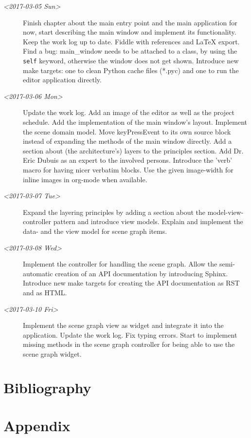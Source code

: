 \documentclass[10pt, openright, notitlepage]{scrreprt}
\begin{document}
\begin{description}
\item[{\textit{<2017-03-05 Sun>}}] Finish chapter about the main entry point and the main
application for now, start describing the main window and implement its
functionality. Keep the work log up to date. Fiddle with references and
\LaTeX{} export. Find a bug: main\_window needs to be attached to a class, by
using the \texttt{self} keyword, otherwise the window does not get shown.
Introduce new make targets: one to clean Python cache files (*.pyc) and one
to run the editor application directly.

\item[{\textit{<2017-03-06 Mon>}}] Update the work log. Add an image of the editor as well as
the project schedule. Add the implementation of the main window's layout.
Implement the scene domain model. Move keyPressEvent to its own source
block instead of expanding the methods of the main window directly. Add a
section about (the architecture's) layers to the principles section. Add
Dr. Eric Dubuis as an expert to the involved persons. Introduce the 'verb'
macro for having nicer verbatim blocks. Use the given image-width for
inline images in org-mode when available.

\item[{\textit{<2017-03-07 Tue>}}] Expand the layering principles by adding a section about
the model-view-controller pattern and introduce view models. Explain and
implement the data- and the view model for scene graph items.

\item[{\textit{<2017-03-08 Wed>}}] Implement the controller for handling the scene graph.
 Allow the semi-automatic creation of an API documentation by introducing
Sphinx. Introduce new make targets for creating the API documentation as
RST and as HTML.

\item[{\textit{<2017-03-10 Fri>}}] Implement the scene graph view as widget and integrate it
 into the application. Update the work log. Fix typing errors. Start to
implement missing methods in the scene graph controller for being able to
use the scene graph widget.
\end{description}

\chapter{Bibliography}
\label{sec:orgce59140}

\printbibliography{}

\chapter{Appendix}
\label{sec:org6f4c0c5}
\end{document}
